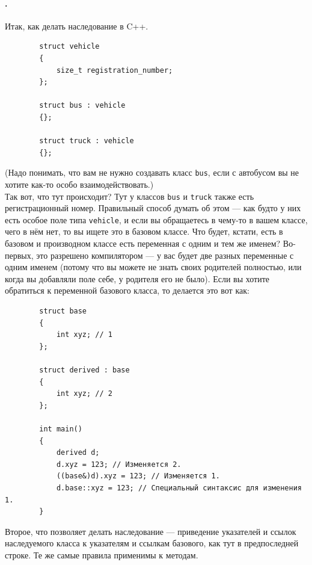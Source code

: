 \documentclass{article}
\begin{document}
    \paragraph{.}
    Итак, как делать наследование в C++.
    \begin{verbatim}
        struct vehicle
        {
            size_t registration_number;
        };

        struct bus : vehicle
        {};

        struct truck : vehicle
        {};
    \end{verbatim}
    (Надо понимать, что вам не нужно создавать класс \texttt{bus}, если с автобусом вы не хотите как-то особо взаимодействовать.)\\
    Так вот, что тут происходит? Тут у классов \texttt{bus} и \texttt{truck} также есть регистрационный номер. Правильный способ думать об этом --- как будто у них есть особое поле типа \texttt{vehicle}, и если вы обращаетесь в чему-то в вашем классе, чего в нём нет, то вы ищете это в базовом классе. Что будет, кстати, есть в базовом и производном классе есть переменная с одним и тем же именем? Во-первых, это разрешено компилятором --- у вас будет две разных переменные с одним именем (потому что вы можете не знать своих родителей полностью, или когда вы добавляли поле себе, у родителя его не было). Если вы хотите обратиться к переменной базового класса, то делается это вот как:
    \begin{verbatim}
        struct base
        {
            int xyz; // 1
        };

        struct derived : base
        {
            int xyz; // 2
        };

        int main()
        {
            derived d;
            d.xyz = 123; // Изменяется 2.
            ((base&)d).xyz = 123; // Изменяется 1.
            d.base::xyz = 123; // Специальный синтаксис для изменения 1.
        }
    \end{verbatim}
    Второе, что позволяет делать наследование --- приведение указателей и ссылок наследуемого класса к указателям и ссылкам базового, как тут в предпоследней строке. Те же самые правила применимы к методам.
\end{document}
